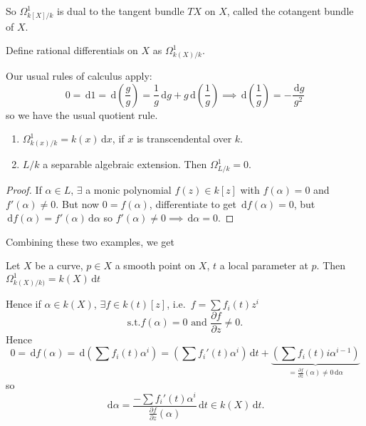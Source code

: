 \documentclass{article}
\newcommand{\diff}{\,\textrm{d}}
\begin{document}
So $\Omega^1_{k[X]/k}$ is dual to the tangent bundle $TX$ on $X$, called the cotangent bundle of $X$.
\begin{defi}
    Define rational differentials on $X$ as $\Omega^1_{k(X)/k}$.
\end{defi}
Our usual rules of calculus apply:
\begin{equation*}
    0 = \diff 1 = \diff \left(\frac{g}{g}\right) = \frac{1}{g} \diff g + g \diff \left(\frac{1}{g}\right) \implies \diff \left(\frac{1}{g}\right) = - \frac{\diff g}{g^2}
\end{equation*}
so we have the usual quotient rule.
\begin{cor}
    \leavevmode
    \begin{enumerate}[label=(\arabic*)]
        \item $\Omega_{k(x)/k}^1 = k(x) \diff x$, if $x$ is transcendental over $k$.
        \item $L/k$ a separable algebraic extension. Then $\Omega^1_{L/k} = 0.$
    \end{enumerate}
\end{cor}
\begin{proof}
    If $\alpha \in L$, $\exists$ a monic polynomial $f(z) \in k[z]$ with $f(\alpha) = 0$ and $f'(\alpha) \neq 0$.
    But now $0 = f(\alpha)$, differentiate to get $\diff f(\alpha) = 0$, but $\diff f(\alpha) = f'(\alpha) \diff \alpha$ so $f'(\alpha) \neq 0 \implies \diff \alpha = 0$.
\end{proof}
Combining these two examples, we get
\begin{lemma}
    Let $X$ be a curve, $p \in X$ a smooth point on $X$, $t$ a local parameter at $p$.
    Then $\Omega^1_{k(X)/k)} = k(X) \diff t$
\end{lemma}
Hence if $\alpha \in k(X)$, $\exists f \in k(t)[z]$, i.e.\ $f = \sum f_i(t) z^i$
\begin{equation*}
    \text{s.t.} f(\alpha) = 0 \text{ and } \frac{\partial f}{\partial z} \neq 0.
\end{equation*}
Hence
\begin{equation*}
    0 = \diff f(\alpha) = \diff (\sum f_i(t) \alpha^i) = (\sum f_i'(t) \alpha^i) \diff t + \underbrace{(\sum f_i(t) i \alpha^{i-1})}_{= \frac{\partial f}{\partial z}(\alpha) \neq 0 \diff \alpha}
\end{equation*}
so
\begin{equation*}
    \diff \alpha = \frac{- \sum f_i'(t) \alpha^i}{\frac{\partial f}{\partial z}(\alpha)} \diff t \in k(X) \diff t.
\end{equation*}
\end{document}
